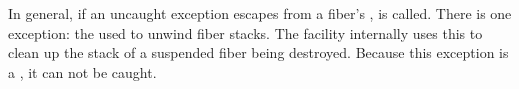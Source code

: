 \label{exceptions}

In general, if an uncaught exception escapes from a fiber's \entryfn,
 is called. There is one exception: the \foreignex used to
unwind fiber stacks. The \fiber facility internally uses this \foreignex to
clean up the stack of a suspended fiber being destroyed. Because this
exception is a \foreignex, it can not be caught.
